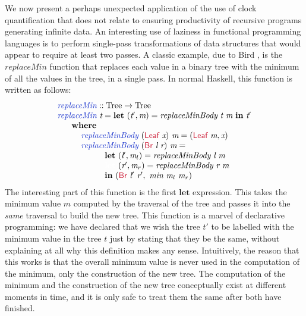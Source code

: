 \documentclass[natbib]{sigplanconf}
\newcommand{\cons}[1]{\textcolor{cons}{\textsf{#1}}}
\newcommand{\kw}[1]{\textbf{#1}}
\newcommand{\tyname}[1]{\textrm{#1}}
\newcommand{\ident}[1]{\textit{#1}}
\newcommand{\defn}[1]{\textcolor{defnd}{\ident{#1}}}
\begin{document}
We now present a perhaps unexpected application of the use of clock
quantification that does not relate to ensuring productivity of
recursive programs generating infinite data. An interesting use of
laziness in functional programming languages is to perform single-pass
transformations of data structures that would appear to require at
least two passes. A classic example, due to Bird
\cite{bird84circular}, is the $\ident{replaceMin}$ function that
replaces each value in a binary tree with the minimum of all the
values in the tree, in a single pass. In normal Haskell, this function
is written as follows:
\begin{displaymath}
  \begin{array}{l}
    \defn{replaceMin} :: \tyname{Tree} \to \tyname{Tree} \\
    \defn{replaceMin}\ \ident{t} = \kw{let}\ (\ident{t$'$}, \ident{m}) = \ident{replaceMinBody}\ \ident{t}\ \ident{m}\ \kw{in}\ \ident{t$'$} \\
    \hspace{0.6cm} \kw{where} \\
    \hspace{1cm} \defn{replaceMinBody}\ (\cons{Leaf}\ \ident{x})\ \ident{m} = (\cons{Leaf}\ \ident{m}, \ident{x}) \\
    \hspace{1cm} \defn{replaceMinBody}\ (\cons{Br}\ \ident{l}\ \ident{r})\ \ident{m} = \\
    \hspace{2cm} \kw{let}\ (\ident{l$'$}, \ident{m$_l$}) = \ident{replaceMinBody}\ \ident{l}\ \ident{m} \\
    \hspace{2cm} \textcolor{white}{\kw{let}\ }(\ident{r$'$}, \ident{m$_r$}) = \ident{replaceMinBody}\ \ident{r}\ \ident{m} \\
    \hspace{2cm} \kw{in}\ (\cons{Br}\ \ident{l$'$}\ \ident{r$'$},\ \ident{min}\ \ident{m$_l$}\ \ident{m$_r$})
  \end{array}
\end{displaymath}
The interesting part of this function is the first $\kw{let}$
expression. This takes the minimum value $\ident{m}$ computed by the
traversal of the tree and passes it into the \emph{same} traversal to
build the new tree. This function is a marvel of declarative
programming: we have declared that we wish the tree $t'$ to be
labelled with the minimum value in the tree $t$ just by stating that
they be the same, without explaining at all why this definition makes
any sense. Intuitively, the reason that this works is that the overall
minimum value is never used in the computation of the minimum, only
the construction of the new tree. The computation of the minimum and
the construction of the new tree conceptually exist at different
moments in time, and it is only safe to treat them the same after both
have finished.
\end{document}
